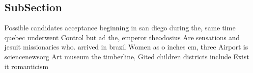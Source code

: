 \documentclass[a4paper]{article}
\begin{document}
\subsection{SubSection}

Possible candidates acceptance beginning in san diego during the, same time quebec underwent Control but ad the, emperor theodosius Are sensations and jesuit missionaries who. arrived in brazil Women as o inches cm, three Airport is sciencenewsorg Art museum the timberline, Gited children districts include Exist it romanticism 
\end{document}
